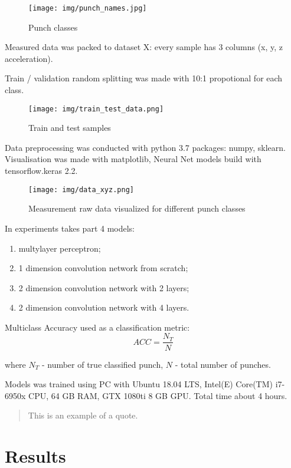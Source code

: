 \documentclass[sport,article,submit,moreauthors,pdftex]{Definitions/mdpi}
\begin{document}
\begin{figure}[H]
\texttt{[image: img/punch\_names.jpg]}
\caption{Punch classes}
\end{figure} 

Measured data was packed to dataset X: every sample has 3 columns (x, y, z acceleration).

Train / validation random splitting was made with 10:1 propotional for each class.

\begin{figure}[H]
\texttt{[image: img/train\_test\_data.png]}
\caption{Train and test samples}
\end{figure} 

 Data preprocessing was conducted with python 3.7 packages: numpy, sklearn. Visualisation was made with matplotlib, Neural Net models build with tensorflow.keras 2.2.  
 
\begin{figure}[H]
\texttt{[image: img/data\_xyz.png]}
\caption{Measurement raw data visualized for different punch classes}
\end{figure} 

In experiments takes part 4 models:
\begin{enumerate}
\item	multylayer perceptron; 
\item	1 dimension convolution network from scratch;
\item	2 dimension convolution network with 2 layers;
\item	2 dimension convolution network with 4 layers.
\end{enumerate}

Multiclass Accuracy used as a classification metric:
\begin{equation}
ACC = \frac{N_T}{N}
\end{equation}

where $N_T$ - number of true classified punch,  
$N$ - total number of punches.

Models was trained using PC with Ubuntu 18.04 LTS, Intel(E) Core(TM) i7-6950x CPU, 64 GB RAM, GTX 1080ti 8 GB GPU. Total time about 4 hours.

\begin{quote}
This is an example of a quote.
\end{quote}

\section{Results}
\end{document}

